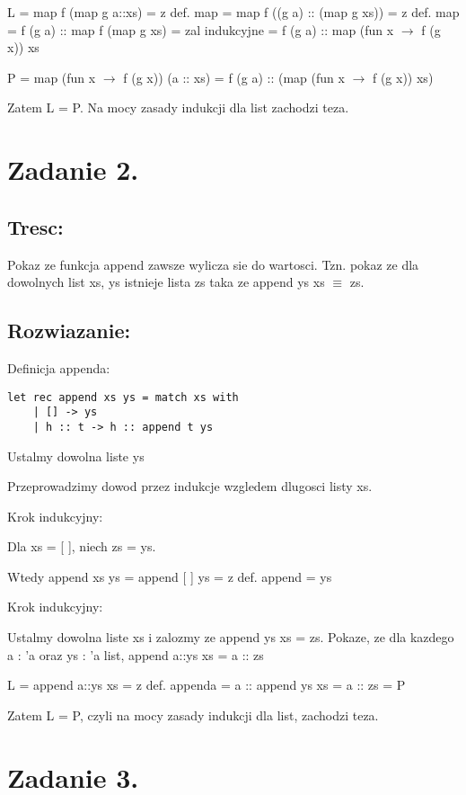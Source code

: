 \documentclass{article}
\begin{document}
L = map f (map g a::xs) = z def. map = map f ((g a) :: (map g xs)) = z def. map = f (g a) :: map f (map g xs) = zal indukcyjne = f (g a) :: map (fun x $\rightarrow$ f (g x)) xs 

P = map (fun x $\rightarrow$ f (g x)) (a :: xs) = f (g a) :: (map (fun x $\rightarrow$ f (g x)) xs)

Zatem L = P. Na mocy zasady indukcji dla list zachodzi teza. 

\section{Zadanie 2.}
\subsection{Tresc:}

Pokaz ze funkcja append zawsze wylicza sie do wartosci. Tzn. pokaz ze dla dowolnych list xs, ys istnieje lista zs taka ze append ys xs $\equiv$ zs.

\subsection{Rozwiazanie:}

Definicja appenda:
\begin{lstlisting}
let rec append xs ys = match xs with
    | [] -> ys
    | h :: t -> h :: append t ys

\end{lstlisting}



Ustalmy dowolna liste ys

Przeprowadzimy dowod przez indukcje wzgledem dlugosci listy xs.

Krok indukcyjny:

Dla xs = [ ], niech zs = ys.

Wtedy append xs ys = append [ ] ys = z def. append = ys

Krok indukcyjny:

Ustalmy dowolna liste xs i zalozmy ze append ys xs = zs. Pokaze, ze dla kazdego a : 'a oraz ys : 'a list, append a::ys xs = a :: zs

L = append a::ys xs = z def. appenda = a :: append ys xs = a :: zs = P

Zatem L = P, czyli na mocy zasady indukcji dla list, zachodzi teza.

\section{Zadanie 3.}
\end{document}

